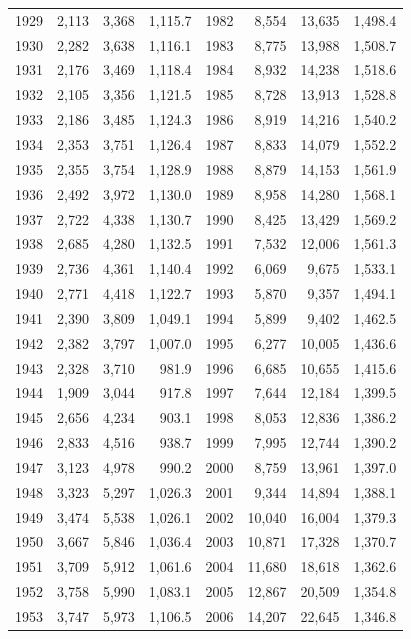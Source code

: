 \begin{longtable}{rrrr@{\hspace{1.2em}}rrrr}
1929 & 2,113 & 3,368 & 1,115.7 & 1982 & 8,554 & 13,635 & 1,498.4 \\
1930 & 2,282 & 3,638 & 1,116.1 & 1983 & 8,775 & 13,988 & 1,508.7 \\
1931 & 2,176 & 3,469 & 1,118.4 & 1984 & 8,932 & 14,238 & 1,518.6 \\
1932 & 2,105 & 3,356 & 1,121.5 & 1985 & 8,728 & 13,913 & 1,528.8 \\
1933 & 2,186 & 3,485 & 1,124.3 & 1986 & 8,919 & 14,216 & 1,540.2 \\
1934 & 2,353 & 3,751 & 1,126.4 & 1987 & 8,833 & 14,079 & 1,552.2 \\
1935 & 2,355 & 3,754 & 1,128.9 & 1988 & 8,879 & 14,153 & 1,561.9 \\
1936 & 2,492 & 3,972 & 1,130.0 & 1989 & 8,958 & 14,280 & 1,568.1 \\
1937 & 2,722 & 4,338 & 1,130.7 & 1990 & 8,425 & 13,429 & 1,569.2 \\
1938 & 2,685 & 4,280 & 1,132.5 & 1991 & 7,532 & 12,006 & 1,561.3 \\
1939 & 2,736 & 4,361 & 1,140.4 & 1992 & 6,069 & 9,675 & 1,533.1 \\
1940 & 2,771 & 4,418 & 1,122.7 & 1993 & 5,870 & 9,357 & 1,494.1 \\
1941 & 2,390 & 3,809 & 1,049.1 & 1994 & 5,899 & 9,402 & 1,462.5 \\
1942 & 2,382 & 3,797 & 1,007.0 & 1995 & 6,277 & 10,005 & 1,436.6 \\
1943 & 2,328 & 3,710 & 981.9 & 1996 & 6,685 & 10,655 & 1,415.6 \\
1944 & 1,909 & 3,044 & 917.8 & 1997 & 7,644 & 12,184 & 1,399.5 \\
1945 & 2,656 & 4,234 & 903.1 & 1998 & 8,053 & 12,836 & 1,386.2 \\
1946 & 2,833 & 4,516 & 938.7 & 1999 & 7,995 & 12,744 & 1,390.2 \\
1947 & 3,123 & 4,978 & 990.2 & 2000 & 8,759 & 13,961 & 1,397.0 \\
1948 & 3,323 & 5,297 & 1,026.3 & 2001 & 9,344 & 14,894 & 1,388.1 \\
1949 & 3,474 & 5,538 & 1,026.1 & 2002 & 10,040 & 16,004 & 1,379.3 \\
1950 & 3,667 & 5,846 & 1,036.4 & 2003 & 10,871 & 17,328 & 1,370.7 \\
1951 & 3,709 & 5,912 & 1,061.6 & 2004 & 11,680 & 18,618 & 1,362.6 \\
1952 & 3,758 & 5,990 & 1,083.1 & 2005 & 12,867 & 20,509 & 1,354.8 \\
1953 & 3,747 & 5,973 & 1,106.5 & 2006 & 14,207 & 22,645 & 1,346.8 \\

\end{longtable}
